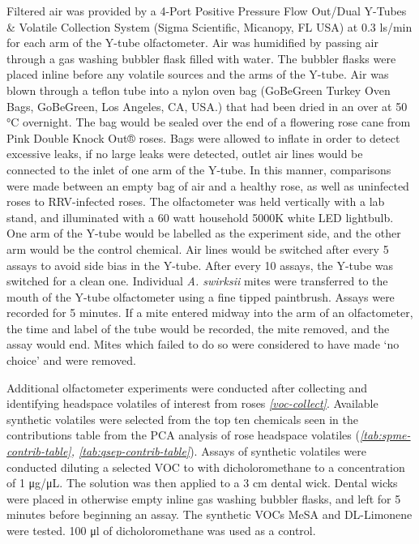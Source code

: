 \documentclass{ufdissertation}[overrideChapters] %
\begin{document}
{Filtered air was provided by a 4-Port Positive Pressure Flow Out/Dual Y-Tubes \& Volatile Collection System (Sigma Scientific, Micanopy, FL USA) at 0.3 \si{\litre}s/min for each arm of the Y-tube olfactometer. Air was humidified by passing air through a gas washing bubbler flask filled with water. The bubbler flasks were placed inline before any volatile sources and the arms of the Y-tube. Air was blown through a teflon tube into a nylon oven bag (GoBeGreen Turkey Oven Bags, GoBeGreen, Los Angeles, CA, USA.) that had been dried in an over at 50 °C overnight. The bag would be sealed over the end of a flowering rose cane from Pink Double Knock Out® roses. Bags were allowed to inflate in order to detect excessive leaks, if no large leaks were detected, outlet air lines would be connected to the inlet of one arm of the Y-tube. In this manner, comparisons were made between an empty bag of air and a healthy rose, as well as uninfected roses to RRV-infected roses. The olfactometer was held vertically with a lab stand, and illuminated with a 60 watt household 5000K white LED lightbulb. One arm of the Y-tube would be labelled as the experiment side, and the other arm would be the control chemical. Air lines would be switched after every 5 assays to avoid side bias in the Y-tube. After every 10 assays, the Y-tube was switched for a clean one. Individual \emph{A. swirksii} mites were transferred to the mouth of the Y-tube olfactometer using a fine tipped paintbrush. Assays were recorded for 5 minutes. If a mite entered midway into the arm of an olfactometer, the time and label of the tube would be recorded, the mite removed, and the assay would end. Mites which failed to do so were considered to have made `no choice' and were removed.

Additional olfactometer experiments were conducted after collecting and identifying headspace volatiles of interest from roses \emph{\ref{voc-collect}}. Available synthetic volatiles were selected from the top ten chemicals seen in the contributions table from the PCA analysis of rose headspace volatiles (\emph{\ref{tab:spme-contrib-table}, \ref{tab:qsep-contrib-table}}). Assays of synthetic volatiles were conducted diluting a selected VOC to with dicholoromethane to a concentration of 1 \si{\micro\gram}/\si{\micro\liter}. The solution was then applied to a 3 \si{\centi\metre} dental wick. Dental wicks were placed in otherwise empty inline gas washing bubbler flasks, and left for 5 minutes before beginning an assay. The synthetic VOCs MeSA and DL-Limonene were tested. 100 \si{\micro\litre} of dicholoromethane was used as a control.

}
\end{document}
